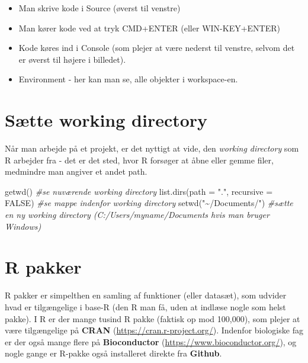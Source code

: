 \documentclass[
]{book}
\newenvironment{Shaded}{\begin{snugshade}}{\end{snugshade}}
\newcommand{\AttributeTok}[1]{\textcolor[rgb]{0.77,0.63,0.00}{#1}}
\newcommand{\CommentTok}[1]{\textcolor[rgb]{0.56,0.35,0.01}{\textit{#1}}}
\newcommand{\ConstantTok}[1]{\textcolor[rgb]{0.00,0.00,0.00}{#1}}
\newcommand{\FunctionTok}[1]{\textcolor[rgb]{0.00,0.00,0.00}{#1}}
\newcommand{\NormalTok}[1]{#1}
\newcommand{\StringTok}[1]{\textcolor[rgb]{0.31,0.60,0.02}{#1}}
\providecommand{\tightlist}{%
  \setlength{\itemsep}{0pt}\setlength{\parskip}{0pt}}
\begin{document}
\begin{itemize}
\tightlist
\item
  Man skrive kode i Source (øverst til venstre)
\item
  Man kører kode ved at tryk CMD+ENTER (eller WIN-KEY+ENTER)
\item
  Kode køres ind i Console (som plejer at være nederst til venstre, selvom det er øverst til højere i billedet).
\item
  Environment - her kan man se, alle objekter i workspace-en.
\end{itemize}

\hypertarget{suxe6tte-working-directory}{%
\section{Sætte working directory}\label{suxe6tte-working-directory}}

Når man arbejde på et projekt, er det nyttigt at vide, den \emph{working directory} som R arbejder fra - det er det sted, hvor R forsøger at åbne eller gemme filer, medmindre man angiver et andet path.

\begin{Shaded}
\begin{Highlighting}[]
\FunctionTok{getwd}\NormalTok{() }\CommentTok{\#se nuværende working directory}
\FunctionTok{list.dirs}\NormalTok{(}\AttributeTok{path =} \StringTok{"."}\NormalTok{, }\AttributeTok{recursive =} \ConstantTok{FALSE}\NormalTok{) }\CommentTok{\#se mappe indenfor working directory}
\FunctionTok{setwd}\NormalTok{(}\StringTok{"\textasciitilde{}/Documents/"}\NormalTok{) }\CommentTok{\#sætte en ny working directory (C:/Users/myname/Documents hvis man bruger Windows)}
\end{Highlighting}
\end{Shaded}

\hypertarget{r-pakker}{%
\section{R pakker}\label{r-pakker}}

R pakker er simpelthen en samling af funktioner (eller datasæt), som udvider hvad er tilgængelige i base-R (den R man få, uden at indlæse nogle som helst pakke). I R er der mange tusind R pakke (faktisk op mod 100,000), som plejer at være tilgængelige på \textbf{CRAN} (\url{https://cran.r-project.org/}). Indenfor biologiske fag er der også mange flere på \textbf{Bioconductor} (\url{https://www.bioconductor.org/}), og nogle gange er R-pakke også installeret direkte fra \textbf{Github}.
\end{document}
